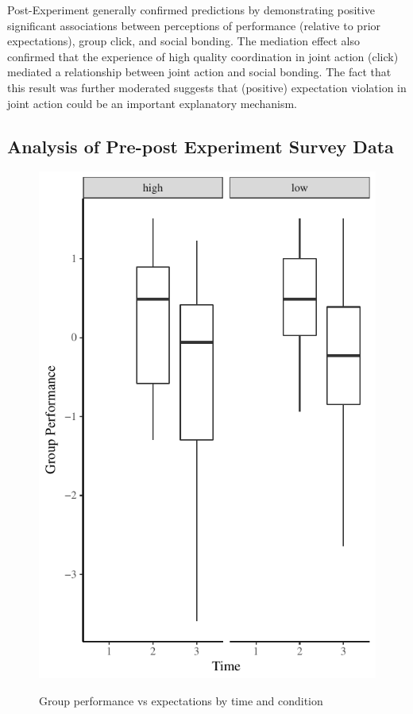 

Post-Experiment generally confirmed predictions by demonstrating positive significant associations between perceptions of performance (relative to prior expectations), group click, and social bonding.  The mediation effect also confirmed that the experience of high quality coordination in joint action (click) mediated a relationship between joint action and social bonding.  The fact that this result was further moderated suggests that (positive) expectation violation in joint action could be an important explanatory mechanism.











\subsection{Analysis of Pre-post Experiment Survey Data}


\begin{figure}
  \centering
    \includegraphics[width=0.5\linewidth,keepaspectratio] {images/groupPerfConfPlot}
    \label{fig:groupPerfConfPlot}
    \caption{Group performance vs expectations by time and condition}
\end{figure}


